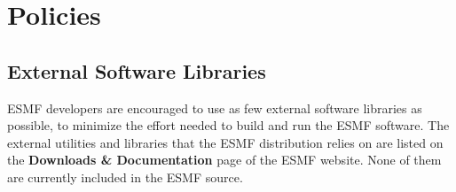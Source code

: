 
\section{Policies}

\subsection{External Software Libraries}
\label{sec:lib}

ESMF developers are encouraged to use as few external
software libraries as possible, to minimize the effort
needed to build and run the ESMF software.  The external
utilities and libraries that the ESMF 
distribution relies on are listed on the {\bf Downloads \&
Documentation} page of the ESMF website.  None of them are 
currently included in the ESMF source.





